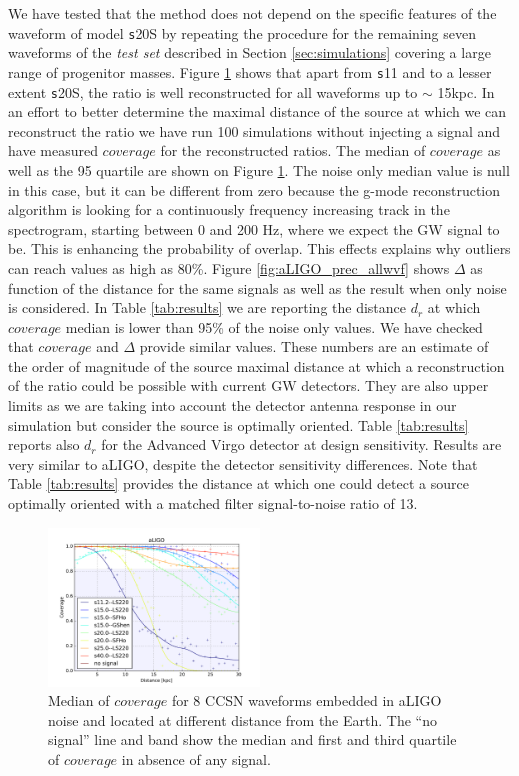 We have tested that the method does not depend on the specific features of the waveform of model {\texttt s20S} by repeating the procedure for the remaining seven waveforms of the {\it test set} described in Section \ref{sec:simulations} covering
a large range of progenitor masses. Figure \ref{fig:aLIGO_cov_allwvf} shows that apart from {\texttt s11} and to a lesser extent
{\texttt s20S}, the ratio is well reconstructed for all waveforms up to $\sim$ 15kpc. In an
effort to better determine the maximal distance of the source at which we can reconstruct the ratio
we have run 100 simulations without injecting a signal and have measured $coverage$ for the
reconstructed ratios.
The median of $coverage$ as well as the 95 quartile are shown on Figure \ref{fig:aLIGO_cov_allwvf}.
The noise only median value is null in this case, but it can be different from zero because
the g-mode reconstruction algorithm is looking for a continuously frequency increasing track
in the spectrogram, starting between 0 and 200 Hz, where we expect the GW signal to be.
This is enhancing the probability of overlap. This effects explains why outliers can reach
values as high as 80\%.
Figure \ref{fig:aLIGO_prec_allwvf} shows $\Delta$ as function of the distance for the same signals
as well as the result when only noise is considered. 
In Table \ref{tab:results} we are reporting the distance $d_r$ at which $coverage$ median is lower
than 95\% of the noise only values. We have checked that $coverage$ and $\Delta$ provide similar
values.
These numbers are an estimate of the order of magnitude of the source maximal distance at which a
reconstruction of the ratio could be possible with current GW detectors.
They are also upper limits as we are taking into account the detector antenna response in our
simulation but consider the source is optimally oriented. 
Table \ref{tab:results} reports also $d_r$ for the Advanced Virgo detector at design sensitivity.
Results are very similar to aLIGO, despite the detector sensitivity differences.
Note that Table \ref{tab:results} provides the distance at which one could detect a source
optimally oriented with a matched filter signal-to-noise ratio of 13.

\begin{figure}
  \centering
  \includegraphics[width=0.5\textwidth]{plots/aLIGO_coverage_allwvfs}
 \caption{Median of $coverage$ for 8 CCSN waveforms embedded in aLIGO noise and located at different distance from the Earth. The ``no signal'' line and band show the median and first and third quartile of $coverage$ in absence of any signal.} \label{fig:aLIGO_cov_allwvf}
\end{figure}

